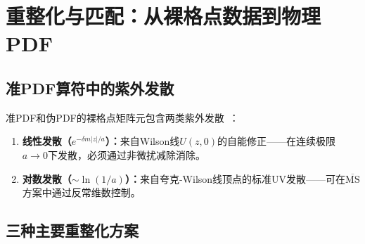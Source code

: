 \documentclass[12pt,a4paper]{ctexart}
\theoremstyle{definition}
\begin{document}
\section{重整化与匹配：从裸格点数据到物理PDF}

\subsection{准PDF算符中的紫外发散}

准PDF和伪PDF的裸格点矩阵元包含两类紫外发散~\cite{Huo2021self,Chen2018WLrenorm,Ji2021hybrid}：

\begin{enumerate}[leftmargin=*]
    \item \textbf{线性发散（$e^{-\delta m |z|/a}$）：}来自Wilson线$U(z,0)$的自能修正——在连续极限$a\to 0$下发散，必须通过非微扰减除消除。
    \item \textbf{对数发散（$\sim \ln(1/a)$）：}来自夸克-Wilson线顶点的标准UV发散——可在$\overline{\text{MS}}$方案中通过反常维数控制。
\end{enumerate}

\subsection{三种主要重整化方案}
\end{document}
